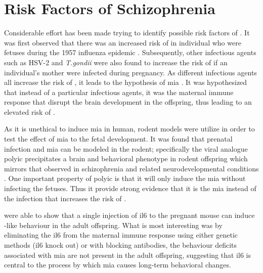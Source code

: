 	\section{Risk Factors of Schizophrenia}
	Considerable effort has been made trying to identify possible risk factors of . 
	It was first observed that there was an increased risk of  in individual who were fetuses during the 1957 influenza epidemic \citep{Mednick1958}. 
	Subsequently, other infectious agents such as HSV-2 and \textit{T.gondii} were also found to increase the risk of  if an individual's mother were infected during pregnancy.
	As different infectious agents all increase the risk of , it leads to the hypothesis of \gls{mia} \citep{Brown2010}.
	It was hypothesized that instead of a particular infectious agents, it was the maternal immune response that disrupt the brain development in the offspring, thus leading to an elevated risk of .

	As it is unethical to induce \gls{mia} in human, rodent models were utilize in order to test the effect of \gls{mia} to the fetal development. 
	It was found that prenatal infection and \gls{mia} can be modeled in the rodent; specifically the viral analogue \gls{polyic} precipitates a brain and behavioral phenotype in rodent offspring which mirrors that observed in schizophrenia and related neurodevelopmental conditions \citep{Li2009c,Meyer2009b,Li2010a}.
	One important property of \gls{polyic} is that it will only induce the \gls{mia} without infecting the fetuses. 
	Thus it provide strong evidence that it is the \gls{mia} instead of the infection that increases the risk of .
	
	\citet{Smith2007} were able to show that a single injection of \gls{il6} to the pregnant mouse can induce -like behaviour in the adult offspring. 
	What is most interesting was by eliminating the \gls{il6} from the maternal immune response using either genetic methods (\gls{il6} knock out) or with blocking antibodies, the behaviour deficits associated with \gls{mia} are not present in the adult offspring, suggesting that \gls{il6} is central to the process by which \gls{mia} causes long-term behavioral changes.
	
